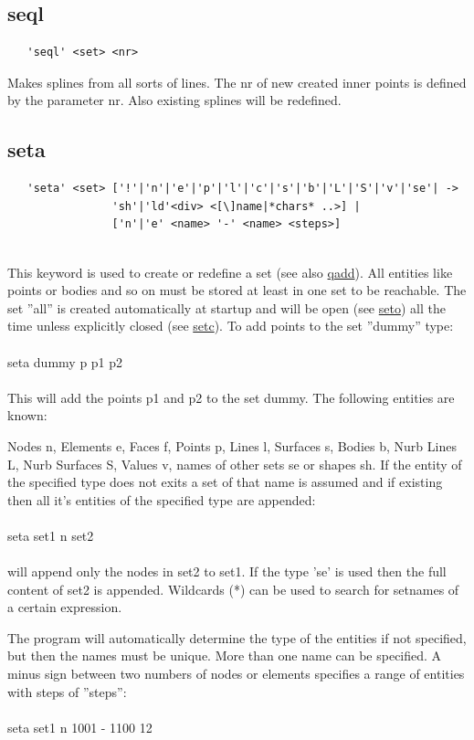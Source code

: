 \documentclass{article}
\providecommand{\htmlref}[2]{\hyperref[#2]{#1}}
\begin{document}
\subsection{\label{seql}seql}
\begin{verbatim}
   'seql' <set> <nr>
\end{verbatim}
Makes splines from all sorts of lines. The nr of new created inner points is defined by the parameter nr. Also existing splines will be redefined.

\subsection{\label{seta}seta}
\begin{verbatim}
   'seta' <set> ['!'|'n'|'e'|'p'|'l'|'c'|'s'|'b'|'L'|'S'|'v'|'se'| ->
                'sh'|'ld'<div> <[\]name|*chars* ..>] |
                ['n'|'e' <name> '-' <name> <steps>]
                
\end{verbatim}
This keyword is used to create or redefine a set (see also \htmlref{qadd}{qadd}). All entities like points or bodies and so on must be stored at least in one set to be reachable. The set ''all'' is created automatically at startup and will be open (see \htmlref{seto}{seto}) all the time unless explicitly closed (see \htmlref{setc}{setc}). To add points to the set ''dummy'' type:\\\\seta dummy p p1 p2\\\\This will add the points p1 and p2 to the set dummy. The following entities are known:

Nodes n, Elements e, Faces f, Points p, Lines l, Surfaces s, Bodies b, Nurb Lines L, Nurb Surfaces S, Values v, names of other sets se or shapes sh. If the entity of the specified type does not exits a set of that name is assumed and if existing then all it's entities of the specified type are appended:\\\\seta set1 n set2\\\\will append only the nodes in set2 to set1. If the type 'se' is used then the full content of set2 is appended. Wildcards (*) can be used to search for setnames of a certain expression.

The program will automatically determine the type of the entities if not specified, but then the names must be unique. More than one name can be specified. A minus sign between two numbers of nodes or elements specifies a range of entities with steps of ''steps'':\\\\seta set1 n 1001 - 1100 12\\\\
\end{document}
